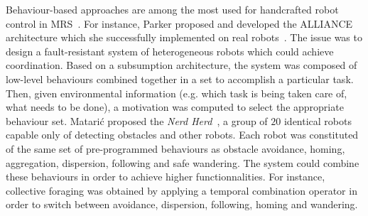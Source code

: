      Behaviour-based approaches are among the most used for handcrafted robot control in MRS~\parencite{Arkin1998, Mataric2008, Parker2008}. For instance, Parker proposed and developed the ALLIANCE architecture which she successfully implemented on real robots~\parencite{Parker1994}. The issue was to design a fault-resistant system of heterogeneous robots which could achieve coordination. Based on a subsumption architecture, the system was composed of low-level behaviours combined together in a set to accomplish a particular task. Then, given environmental information (e.g. which task is being taken care of, what needs to be done), a motivation was computed to select the appropriate behaviour set. Matarić proposed the \emph{Nerd Herd}~\parencite{Mataric1995}, a group of $20$ identical robots capable only of detecting obstacles and other robots. Each robot was constituted of the same set of pre-programmed behaviours as obstacle avoidance, homing, aggregation, dispersion, following and safe wandering. The system could combine these behaviours in order to achieve higher functionnalities. For instance, collective foraging was obtained by applying a temporal combination operator in order to switch between avoidance, dispersion, following, homing and wandering. 








